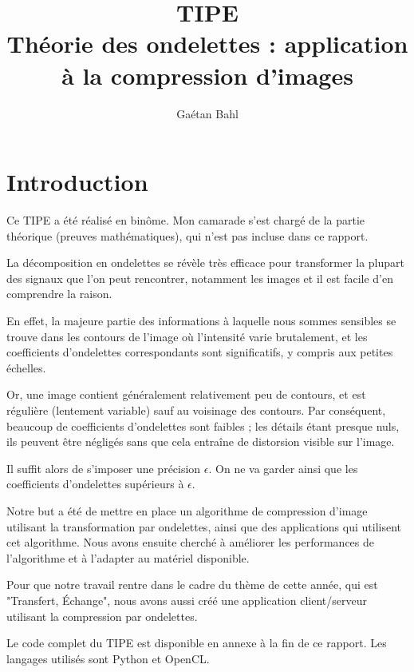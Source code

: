 \documentclass{article}
\title{TIPE \\ Théorie des ondelettes : application à la compression d'images}
\author{Gaétan Bahl}
\begin{document}
\maketitle
\tableofcontents
\listoffigures
{}
\clearpage

\newcommand{\fonction}[5]{\begin{array}{l|rcl}
#1: & #2 & \longrightarrow & #3 \\
    & #4 & \longmapsto & #5 \end{array}}


\section{Introduction}

Ce TIPE a été réalisé en binôme. Mon camarade s'est chargé de la partie théorique (preuves mathématiques), qui n'est pas incluse dans ce rapport.

La décomposition en ondelettes se révèle très efficace pour transformer la plupart des signaux que l'on peut rencontrer, notamment les images et il est facile d'en comprendre la raison. 

En effet, la majeure partie des informations à laquelle nous sommes sensibles se trouve dans les contours de l'image où l'intensité varie brutalement, et les coefficients d'ondelettes correspondants sont significatifs, y compris aux petites échelles. 

Or, une image contient généralement relativement peu de contours, et est régulière (lentement variable) sauf au voisinage des contours. Par conséquent, beaucoup de coefficients d'ondelettes sont faibles ; les détails étant presque nuls, ils peuvent être négligés sans que cela entraîne de distorsion visible sur l'image. 

Il suffit alors de s’imposer une précision $\epsilon$. On ne va garder ainsi que les coefficients d’ondelettes supérieurs à $\epsilon$. 


Notre but a été de mettre en place un
algorithme de compression d'image utilisant la transformation par
ondelettes, ainsi que des applications qui utilisent cet algorithme. Nous avons ensuite cherché à améliorer les performances de l'algorithme et à l'adapter au matériel disponible.

Pour que notre travail rentre dans le cadre du thème de cette année, qui est "Transfert, Échange", nous avons aussi créé une application client/serveur utilisant la compression par ondelettes.

Le code complet du TIPE est disponible en annexe à la fin de ce rapport. Les langages utilisés sont Python et OpenCL.
\end{document}

